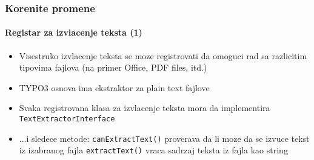 \begin{frame}[fragile]
	\frametitle{Korenite promene}
	\framesubtitle{Registar za izvlacenje teksta (1)}

	\lstset{basicstyle=\tiny\ttfamily}

	\begin{itemize}

		\item Visestruko izvlacenje teksta se moze registrovati da omoguci rad sa razlicitim tipovima fajlova (na primer Office, PDF files, itd.)

		\item TYPO3 osnova ima ekstraktor za plain text fajlove

		\item Svaka registrovana klasa za izvlacenje teksta mora da implementira \texttt{TextExtractorInterface}

		\item ...i sledece metode:\newline
			\texttt{canExtractText()}\newline
			\small
				proverava da li moze da se izvuce tekst iz izabranog fajla 
			\normalsize
			\newline
			\texttt{extractText()}\newline
			\small
				vraca sadrzaj teksta iz fajla kao string
			\normalsize

	\end{itemize}

\end{frame}

